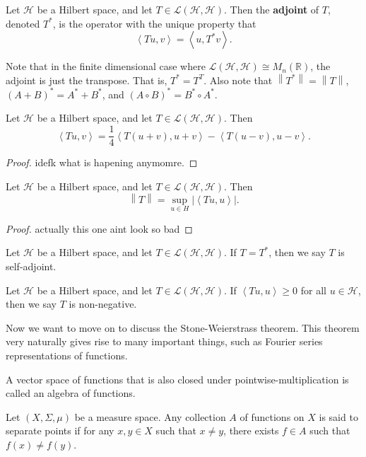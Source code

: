 \documentclass[11pt, letterpaper]{report}
\begin{document}
\begin{definition}[Adjoint]\label{dfn:2.41}
	Let $\mathcal{H} $ be a Hilbert space, and let $T\in \mathcal{L} (\mathcal{H} ,\mathcal{H} )$. Then the \textbf{adjoint} of $T$, denoted $T^*$, is the operator with the unique property that
	\[
		\left\langle Tu,v \right\rangle =\left\langle u,T^*v \right\rangle 
	.\]
\end{definition}
Note that in the finite dimensional case where $\mathcal{L} (\mathcal{H} ,\mathcal{H} )\cong M_n(\mathbb{R})$, the adjoint is just the transpose. That is, $T^*=T^T$. Also note that $\left\lVert T^* \right\rVert =\left\lVert T \right\rVert $, $\left( A+B \right)^*=A^*+B^*$, and $(A\circ B)^*=B^*\circ A^*$.
\begin{theorem}\label{thm:2.14}
	Let $\mathcal{H} $ be a Hilbert space, and let $T\in \mathcal{L} (\mathcal{H} ,\mathcal{H} )$. Then
	\[
		\left\langle Tu,v \right\rangle =\frac{1}{4}\left\langle T(u+v),u+v \right\rangle -\left\langle T(u-v),u-v \right\rangle 
	.\]
\end{theorem}
\begin{proof}
	idefk what is hapening anymomre.
\end{proof}
\begin{theorem}\label{thm:2.15}
	Let $\mathcal{H} $ be a Hilbert space, and let $T\in \mathcal{L} (\mathcal{H} ,\mathcal{H} )$. Then
	\[
		\left\lVert T \right\rVert =\sup_{u\in H}\left| \left\langle Tu,u \right\rangle  \right| 
	.\]
\end{theorem}
\begin{proof}
	actually this one aint look so bad
\end{proof}
\begin{definition}\label{dfn:2.42}
	Let $\mathcal{H} $ be a Hilbert space, and let $T\in \mathcal{L} (\mathcal{H} ,\mathcal{H} ) $. If $T=T^*$, then we say $T$ is self-adjoint.
\end{definition}
\begin{definition}\label{dfn:2.43}
	Let $\mathcal{H} $ be a Hilbert space, and let $T\in \mathcal{L} (\mathcal{H} ,\mathcal{H} ) $. If $\left\langle Tu,u \right\rangle \geq 0$ for all $u\in \mathcal{H} $, then we say $T$ is non-negative.
\end{definition}

Now we want to move on to discuss the Stone-Weierstrass theorem. This theorem very naturally gives rise to many important things, such as Fourier series representations of functions.
\begin{definition}\label{dfn:2.44}
	A vector space of functions that is also closed under pointwise-multiplication is called an algebra of functions.
\end{definition}
\begin{definition}\label{dfn:2.45}
	Let $(X,\Sigma ,\mu )$ be a measure space. Any collection $A$ of functions on $X$ is said to separate points if for any $x,y\in X$ such that $x\neq y$, there exists $f\in A$ such that $f(x)\neq f(y)$.
\end{definition}
\end{document}
